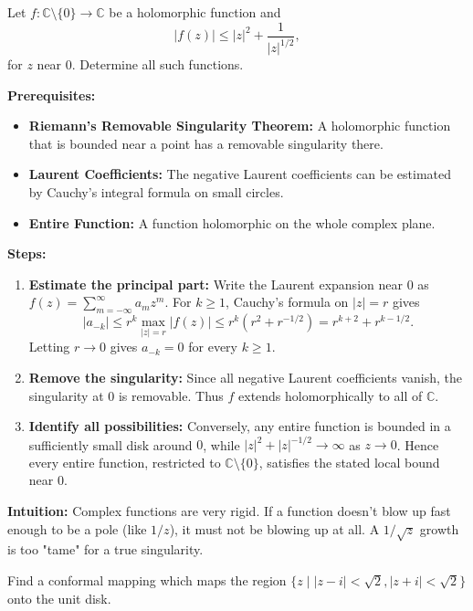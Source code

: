 \begin{exercise}
\label{analysis:2017:3}
Let $f:\mathbb{C}\setminus\{0\}\to\mathbb{C}$ be a holomorphic function and
\[
|f(z)| \leq |z|^2 + \frac{1}{|z|^{1/2}},
\]
for $z$ near 0. Determine all such functions.
\end{exercise}

\begin{solution}
\textbf{Prerequisites:}
\begin{itemize}
    \item \textbf{Riemann's Removable Singularity Theorem:} A holomorphic function that is bounded near a point has a removable singularity there.
    \item \textbf{Laurent Coefficients:} The negative Laurent coefficients can be estimated by Cauchy's integral formula on small circles.
    \item \textbf{Entire Function:} A function holomorphic on the whole complex plane.
\end{itemize}

\textbf{Steps:}
\begin{enumerate}
    \item \textbf{Estimate the principal part:} Write the Laurent expansion near $0$ as $f(z)=\sum_{m=-\infty}^{\infty}a_mz^m$. For $k\geq 1$, Cauchy's formula on $|z|=r$ gives
    \[
    |a_{-k}|
    \leq r^k\max_{|z|=r}|f(z)|
    \leq r^k\left(r^2+r^{-1/2}\right)
    =r^{k+2}+r^{k-1/2}.
    \]
    Letting $r\to 0$ gives $a_{-k}=0$ for every $k\geq 1$.
    \item \textbf{Remove the singularity:} Since all negative Laurent coefficients vanish, the singularity at $0$ is removable. Thus $f$ extends holomorphically to all of $\mathbb{C}$.
    \item \textbf{Identify all possibilities:} Conversely, any entire function is bounded in a sufficiently small disk around $0$, while $|z|^2+|z|^{-1/2}\to\infty$ as $z\to0$. Hence every entire function, restricted to $\mathbb{C}\setminus\{0\}$, satisfies the stated local bound near $0$.
\end{enumerate}

\textbf{Intuition:}
Complex functions are very rigid. If a function doesn't blow up fast enough to be a pole (like $1/z$), it must not be blowing up at all. A $1/\sqrt{z}$ growth is too "tame" for a true singularity.
\end{solution}

\begin{exercise}
\label{analysis:2017:4}
Find a conformal mapping which maps the region $\{z\mid |z-i|<\sqrt{2}, |z+i|<\sqrt{2}\}$ onto the unit disk.
\end{exercise}

